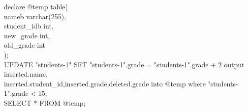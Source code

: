 \documentclass{article}
\begin{document}
\begin{enumerate}
\begin{enumerate}
                declare @temp table(\\
                nameb varchar(255),\\
                student\_idb int,\\
                new\_grade int,\\
                old\_grade int\\
                );\\
                UPDATE "students-1" SET "students-1".grade = "students-1".grade + 2 output inserted.name,\\
                inserted.student\_id,inserted.grade,deleted.grade into @temp where "students-1".grade < 15;\\
                SELECT * FROM @temp;\\
        \end{enumerate}
\end{enumerate}
\end{document}
